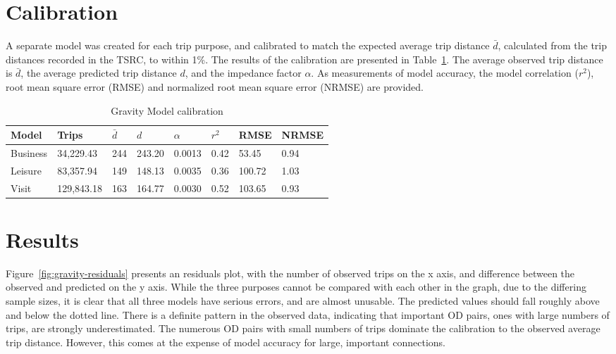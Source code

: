 \section{Calibration}
A separate model was created for each trip purpose, and calibrated to match the expected average trip distance $\bar{d}$, calculated from the trip distances recorded in the TSRC, to within 1\%. The results of the calibration are presented in Table~\ref{table:gravity-calibration}. The average observed trip distance is $\bar{d}$, the average predicted trip distance $d$, and the impedance factor $\alpha$. As measurements of model accuracy, the model correlation ($r^2$), root mean square error (RMSE) and normalized root mean square error (NRMSE) are provided.

\begin{table}[H]
\centering
\caption{Gravity Model calibration}
\label{table:gravity-calibration}
\begin{tabular}{@{}lllll|lll@{}}
\toprule
Model & Trips & $\bar{d}$ & $d$ & $\alpha$ & $r^2$ & RMSE & NRMSE \\ \midrule
   Business  & 34,229.43  &     244     &  243.20   & 0.0013  & 0.42 & 53.45 & 0.94 \\
   Leisure   & 83,357.94  &     149     &  148.13   & 0.0035  & 0.36 & 100.72 & 1.03 \\
   Visit     & 129,843.18 &     163     &  164.77   & 0.0030 & 0.52 & 103.65 & 0.93 \\ \bottomrule
\end{tabular}
\end{table}

\section{Results}
Figure~\ref{fig:gravity-residuals} presents an residuals plot, with the number of observed trips on the x axis, and difference between the observed and predicted on the y axis. While the three purposes cannot be compared with each other in the graph, due to the differing sample sizes, it is clear that all three models have serious errors, and are almost unusable. The predicted values should fall roughly above and below the dotted line. There is a definite pattern in the observed data, indicating that important OD pairs, ones with large numbers of trips, are strongly underestimated. The numerous OD pairs with small numbers of trips dominate the calibration to the observed average trip distance. However, this comes at the expense of model accuracy for large, important connections.


